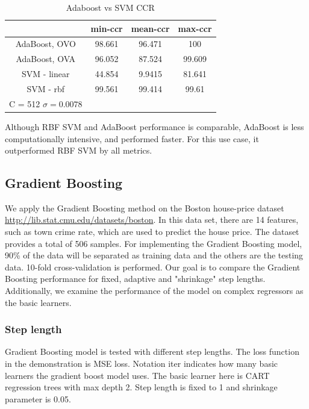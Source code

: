 \documentclass[10pt,twocolumn,letterpaper]{article}
\begin{document}
\begin{table}[ht]
\centering
\caption{Adaboost vs SVM CCR}
 \begin{tabular}{||c c c c||} 
 \hline
  & min-ccr & mean-ccr & max-ccr \\ 
 \hline\hline
AdaBoost, OVO & 98.661 & 96.471 & 100  \\ 
 \hline\hline
AdaBoost, OVA &96.052 & 87.524 & 99.609 \\ 
\hline\hline
SVM - linear & 44.854 & 9.9415 & 81.641 \\ 
\hline\hline
SVM - rbf & 99.561 & 99.414 & 99.61 \\
C = 512 $\sigma = 0.0078$ & & & \\
 \hline \hline
\end{tabular}
\label{table:adaccr}
\end{table}
\indent Although RBF SVM and AdaBoost performance is comparable, AdaBoost is less computationally  intensive, and performed faster. For this use case, it outperformed RBF SVM by all metrics.

\subsection{Gradient Boosting}
 We apply the Gradient Boosting method on the Boston house-price dataset \url{http://lib.stat.cmu.edu/datasets/boston}. In this data set, there are 14 features, such as town crime rate, which are used to predict the house price. The dataset provides a total of 506 samples. For implementing the Gradient Boosting model, 90\% of the data will be separated as training data and the others are the testing data. 10-fold cross-validation is performed. Our goal is to compare the Gradient Boosting performance for fixed, adaptive and "shrinkage" step lengths. Additionally, we examine the performance of the model on complex regressors as the basic learners. 

\subsubsection{Step length}

Gradient Boosting model is tested with different step lengths. The loss function in the demonstration is MSE loss. Notation iter indicates how many basic learners the gradient boost model uses. The basic learner here is CART regression trees with max depth 2. Step length is fixed to 1 and shrinkage parameter is 0.05.
\end{document}
